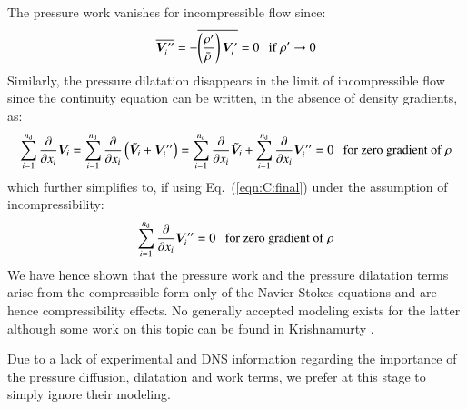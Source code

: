 \documentclass{warpdoc}
\newcommand{\nd}{{{n}_{\rm d}}}
\begin{document}
%
The pressure work vanishes for incompressible flow since:
%
\begin{displaymath}
  \overline{\bm{V}_i^{{\prime\prime}}}
   = -\overline{\left(\frac{\rho^{\prime}}{\bar{\rho}\,}\right) \bm{V}_i^{\prime}}
   = 0
  {       \rm ~~~if~   }\rho^{\prime} \rightarrow 0
\end{displaymath}
%
Similarly, the pressure dilatation disappears in the limit of incompressible
flow since the continuity equation can be written, in the absence of
density gradients, as:
%
\begin{displaymath}
     \sum_{i=1}^\nd \frac{\partial }{\partial x_i} \bm{V}_i
   = \sum_{i=1}^\nd \frac{\partial }{\partial x_i} \left( {\wtilde{\bm{V}}_i}+\bm{V}_i^{{\prime\prime}}  \right)
   = \sum_{i=1}^\nd \frac{\partial }{\partial x_i} {\wtilde{\bm{V}}_i}
     + \sum_{i=1}^\nd \frac{\partial }{\partial x_i} \bm{V}_i^{{\prime\prime}}
   = 0
  {      \rm ~~~for~zero~gradient~of~}\rho
\end{displaymath}
%
which further simplifies to, if using Eq.\ (\ref{eqn:C:final}) under the assumption
of incompressibility:
%
\begin{displaymath}
  \sum_{i=1}^\nd \frac{\partial }{\partial x_i} \bm{V}_i^{{\prime\prime}}
   = 0{      \rm ~~~for~zero~gradient~of~}\rho
\end{displaymath}
%
We have hence shown that the pressure work and the pressure dilatation terms
arise from the compressible form only of the Navier-Stokes equations and
are hence compressibility effects. No generally accepted modeling exists
for the latter although some work on this topic can be found in
Krishnamurty \cite{turb:krish}.

Due to a lack of experimental and DNS information regarding the importance
of the pressure diffusion, dilatation and work terms, we prefer at this stage
to simply ignore their modeling.
\end{document}
